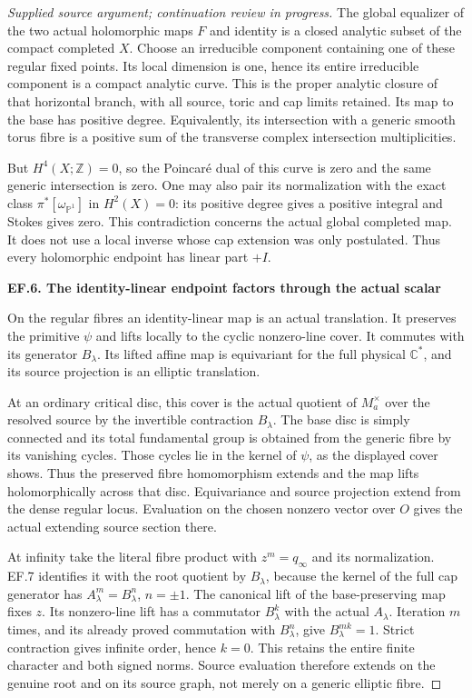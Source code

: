 \begin{proof}[Supplied source argument; continuation review in progress]
The global equalizer of the two actual holomorphic maps \(F\) and
identity is a closed analytic subset of the compact completed \(X\).
Choose an irreducible component containing one of these regular fixed
points. Its local dimension is one, hence its entire irreducible
component is a compact analytic curve. This is the proper analytic
closure of that horizontal branch, with all source, toric and cap
limits retained. Its map to the base has positive degree. Equivalently,
its intersection with a generic smooth torus fibre is a positive sum
of the transverse complex intersection multiplicities.

But \(H^4(X;\mathbb Z)=0\), so the Poincaré dual of this curve is
zero and the same generic intersection is zero. One may also pair its
normalization with the exact class \(\pi^*[\omega_{\mathbb P^1}]\)
in \(H^2(X)=0\): its positive degree gives a positive integral and
Stokes gives zero. This contradiction concerns the actual global
completed map. It does not use a local inverse whose cap extension was
only postulated. Thus every holomorphic endpoint has linear part \(+I\).

\par

\medskip\noindent\textbf{EF.6. The identity-linear endpoint factors through the actual scalar}

\par\nobreak

On the regular fibres an identity-linear map is an actual translation.
It preserves the primitive \(\psi\) and lifts locally to the cyclic
nonzero-line cover. It commutes with its generator \(B_\lambda\).
Its lifted affine map is equivariant for the full physical \(\mathbb
C^*\), and its source projection is an elliptic translation.

At an ordinary critical disc, this cover is the actual quotient of
\(M_a^\times\) over the resolved source by the invertible contraction
\(B_\lambda\). The base disc is simply connected and its total
fundamental group is obtained from the generic fibre by its vanishing
cycles. Those cycles lie in the kernel of \(\psi\), as the displayed
cover shows. Thus the preserved fibre homomorphism extends and the map
lifts holomorphically across that disc. Equivariance and source
projection extend from the dense regular locus. Evaluation on the
chosen nonzero vector over \(O\) gives the actual extending source
section there.

At infinity take the literal fibre product with \(z^m=q_\infty\)
and its normalization. EF.7 identifies it with the root quotient by
\(B_\lambda\), because the kernel of the full cap generator has
\(A_\lambda^m=B_\lambda^n\), \(n=\pm1\). The canonical lift of
the base-preserving map fixes \(z\). Its nonzero-line lift has a
commutator \(B_\lambda^k\) with the actual \(A_\lambda\).
Iteration \(m\) times, and its already proved commutation with
\(B_\lambda^n\), give \(B_\lambda^{mk}=1\). Strict contraction
gives infinite order, hence \(k=0\). This retains the entire finite
character and both signed norms. Source evaluation therefore extends
on the genuine root and on its source graph, not merely on a generic
elliptic fibre.


\end{proof}

